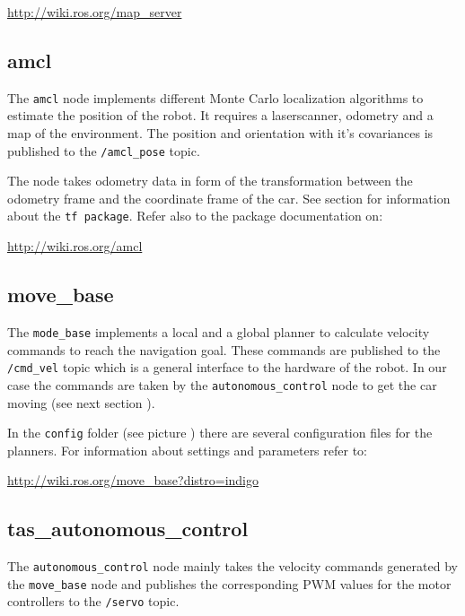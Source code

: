 {\hyperref[http://wiki.ros.org/map_server]{http://wiki.ros.org/map\_server}


\subsection{amcl}
\label{sec:tas_package_amcl}
The \texttt{amcl} node implements different Monte Carlo localization algorithms to estimate the position of the robot. It requires a laserscanner, odometry and a map of the environment. The position and orientation with it's covariances is published to the \texttt{/amcl\_pose} topic.

The node takes odometry data in form of the transformation between the odometry frame and the coordinate frame of the car. See section  for information about the \texttt{tf package}. Refer also to the package documentation on:

\hyperref[http://wiki.ros.org/amcl]{http://wiki.ros.org/amcl}



\subsection{move\_base}
\label{sec:tas_package_move_base}

The \texttt{mode\_base} implements a local and a global planner to calculate velocity commands to reach the navigation goal. These commands are published to the \texttt{/cmd\_vel} topic which is a general interface to the hardware of the robot. In our case the commands are taken by the \texttt{autonomous\_control} node to get the car moving (see next section ).

In the \texttt{config} folder (see picture ) there are several configuration files for the planners. For information about settings and parameters refer to:

\hyperref[http://wiki.ros.org/move_base?distro=indigo]{http://wiki.ros.org/move\_base?distro=indigo}

\subsection{tas\_autonomous\_control}
\label{sec:tas_package_autonomous_control}
The  \texttt{autonomous\_control} node mainly takes the velocity commands generated by the \texttt{move\_base} node and publishes the corresponding PWM values for the motor controllers to the \texttt{/servo} topic.

}
